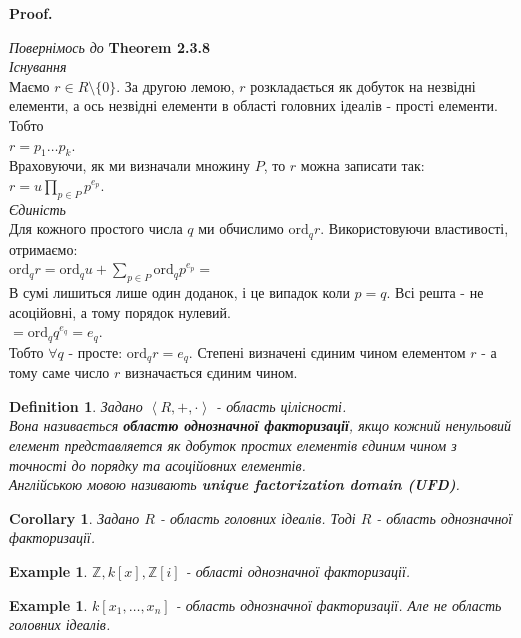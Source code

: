 \documentclass[a4paper, 10pt]{article}
\makeatletter
\theoremstyle{theoremdd}
\theoremstyle{theoremdd}
\newtheorem{definition}[theorem]{Definition}
\theoremstyle{theoremdd}
\theoremstyle{theoremdd}
\newtheorem{example}[theorem]{Example}
\theoremstyle{theoremdd}
\theoremstyle{theoremdd}
\theoremstyle{theoremdd}
\theoremstyle{theoremdd}
\newtheorem{corollary}[theorem]{Corollary}
\renewenvironment{proof}[1][Proof.\\]{\par
\pushQED{\hfill \qed}%
\normalfont \topsep6\p@\@plus6\p@\relax
\trivlist
\item\relax
{\bfseries
#1\@addpunct{.}}\hspace\labelsep\ignorespaces
}{%
\popQED\endtrivlist\@endpefalse
}
\makeatother
\begin{document}
\begin{proof}
\textit{Повернімось до} \textbf{Theorem 2.3.8}\\
\textit{Існування}\\
Маємо $r \in R \setminus \{0\}$. За другою лемою, $r$ розкладається як добуток на незвідні елементи, а ось незвідні елементи в області головних ідеалів - прості елементи. Тобто\\
$r = p_1 \dots p_k$.\\
Враховуючи, як ми визначали множину $P$, то $r$ можна записати так:\\
$r = u \displaystyle\prod_{p \in P} p^{e_p}$.
\bigskip \\
\textit{Єдиність}\\
Для кожного простого числа $q$ ми обчислимо $\text{ord}_q r$. Використовуючи властивості, отримаємо:\\
$\text{ord}_q r = \text{ord}_q u + \displaystyle\sum_{p \in P} \text{ord}_q p^{e_p} \boxed{=}$\\
В сумі лишиться лише один доданок, і це випадок коли $p = q$. Всі решта - не асоційовні, а тому порядок нулевий.\\
$\boxed{=} \text{ord}_q q^{e_q} = e_q$.\\
Тобто $\forall q$ - просте: $\text{ord}_q r = e_q$. Степені визначені єдиним чином елементом $r$ - а тому саме число $r$ визначається єдиним чином. 
\end{proof}


\begin{definition}
Задано $\left<R,+,\cdot \right>$ - область цілісності.\\
Вона називається \textbf{областю однозначної факторизації}, якщо кожний ненульовий елемент представляется як добуток простих елементів єдиним чином з точності до порядку та асоційовних елементів.\\
Англійською мовою називають \textbf{unique factorization domain (UFD)}.
\end{definition}

\begin{corollary}
Задано $R$ - область головних ідеалів. Тоді $R$ - область однозначної факторизації.
\end{corollary}

\begin{example}
$\mathbb{Z}, k[x], \mathbb{Z}[i]$ - області однозначної факторизації.
\end{example}

\begin{example}
$k[x_1,\dots,x_n]$ - область однозначної факторизації. Але не область головних ідеалів.
\end{example}
\newpage
\end{document}
